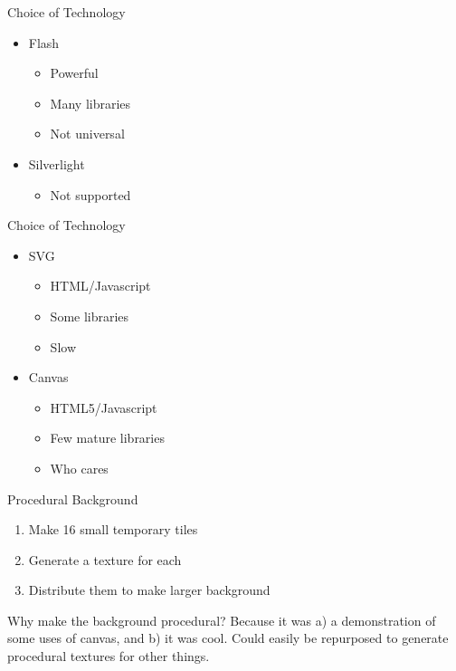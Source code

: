 \begin{frame}{Choice of Technology}
  \begin{itemize}
    \item Flash
      \begin{itemize}
        \item Powerful
        \item Many libraries
        \item Not universal
      \end{itemize}
    \item Silverlight
      \begin{itemize}
        \item Not supported
      \end{itemize}
  \end{itemize}
\end{frame}

\begin{frame}{Choice of Technology}
  \begin{itemize}
    \item SVG
      \begin{itemize}
        \item HTML/Javascript
        \item Some libraries
        \item Slow
      \end{itemize}
    \item Canvas
      \begin{itemize}
        \item HTML5/Javascript
        \item Few mature libraries
        \item Who cares
      \end{itemize}
  \end{itemize}
\end{frame}

\begin{frame}{Procedural Background}
  \begin{enumerate}
    \item Make 16 small temporary tiles
    \item Generate a texture for each
    \item Distribute them to make larger background
  \end{enumerate}
\end{frame}
\begin{flushleft}
  Why make the background procedural? Because it was a) a demonstration of some uses of canvas, and b) it was cool.
  Could easily be repurposed to generate procedural textures for other things.
\end{flushleft}

